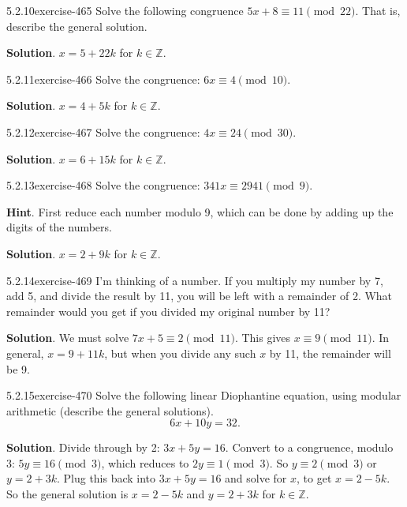\documentclass[twoside,11pt,]{book}
\numberwithin{equation}{chapter}
\newcommand{\Z}{\mathbb Z}
\begin{document}
\begin{divisionsolution}{5.2.10}{}{exercise-465}%
\hypertarget{p-5293}{}%
Solve the following congruence \(5x + 8 \equiv 11 \pmod{22}\).  That is, describe the general solution.%
\par\smallskip%
\noindent\textbf{Solution}.\quad%
\hypertarget{p-5294}{}%
\(x = 5+22k\) for \(k \in \Z\).%
\end{divisionsolution}%
\begin{divisionsolution}{5.2.11}{}{exercise-466}%
\hypertarget{p-5295}{}%
Solve the congruence: \(6x \equiv 4 \pmod{10}\).%
\par\smallskip%
\noindent\textbf{Solution}.\quad%
\hypertarget{p-5296}{}%
\(x = 4 + 5k\) for \(k \in \Z\).%
\end{divisionsolution}%
\begin{divisionsolution}{5.2.12}{}{exercise-467}%
\hypertarget{p-5297}{}%
Solve the congruence: \(4x \equiv 24 \pmod{30}\).%
\par\smallskip%
\noindent\textbf{Solution}.\quad%
\hypertarget{p-5298}{}%
\(x = 6 + 15k\) for \(k \in \Z\).%
\end{divisionsolution}%
\begin{divisionsolution}{5.2.13}{}{exercise-468}%
\hypertarget{p-5299}{}%
Solve the congruence: \(341x \equiv 2941 \pmod{9}\).%
\par\smallskip%
\noindent\textbf{Hint}.\quad%
\hypertarget{p-5300}{}%
First reduce each number modulo 9, which can be done by adding up the digits of the numbers.%
\par\smallskip%
\noindent\textbf{Solution}.\quad%
\hypertarget{p-5301}{}%
\(x = 2 + 9k\) for \(k \in \Z\).%
\end{divisionsolution}%
\begin{divisionsolution}{5.2.14}{}{exercise-469}%
\hypertarget{p-5302}{}%
I'm thinking of a number. If you multiply my number by 7, add 5, and divide the result by 11, you will be left with a remainder of 2. What remainder would you get if you divided my original number by 11?%
\par\smallskip%
\noindent\textbf{Solution}.\quad%
\hypertarget{p-5303}{}%
We must solve \(7x + 5 \equiv 2 \pmod{11}\). This gives \(x \equiv 9 \pmod{11}\). In general, \(x = 9 + 11k\), but when you divide any such \(x\) by 11, the remainder will be 9.%
\end{divisionsolution}%
\begin{divisionsolution}{5.2.15}{}{exercise-470}%
\hypertarget{p-5304}{}%
Solve the following linear Diophantine equation, using modular arithmetic (describe the general solutions).%
\begin{equation*}
6x + 10y = 32\text{.}
\end{equation*}
%
\par\smallskip%
\noindent\textbf{Solution}.\quad%
\hypertarget{p-5305}{}%
Divide through by 2: \(3x + 5y = 16\). Convert to a congruence, modulo 3: \(5y \equiv 16 \pmod 3\), which reduces to \(2y \equiv 1 \pmod 3\). So \(y \equiv 2 \pmod 3\) or \(y = 2 + 3k\). Plug this back into \(3x + 5y = 16\) and solve for \(x\), to get \(x = 2-5k\). So the general solution is \(x = 2-5k\) and \(y = 2+3k\) for \(k \in \Z\).%
\end{divisionsolution}%
\end{document}
